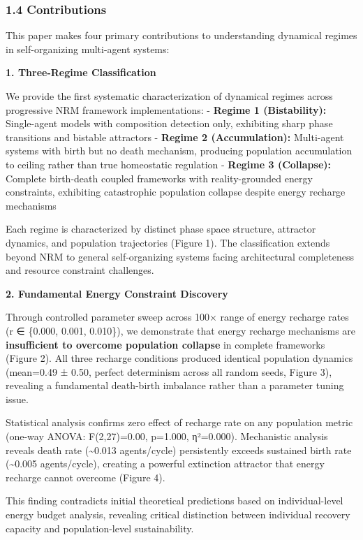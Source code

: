 \documentclass[
]{article}
\begin{document}
\subsubsection{1.4 Contributions}\label{contributions}

This paper makes four primary contributions to understanding dynamical
regimes in self-organizing multi-agent systems:

\textbf{1. Three-Regime Classification}

We provide the first systematic characterization of dynamical regimes
across progressive NRM framework implementations: - \textbf{Regime 1
(Bistability):} Single-agent models with composition detection only,
exhibiting sharp phase transitions and bistable attractors -
\textbf{Regime 2 (Accumulation):} Multi-agent systems with birth but no
death mechanism, producing population accumulation to ceiling rather
than true homeostatic regulation - \textbf{Regime 3 (Collapse):}
Complete birth-death coupled frameworks with reality-grounded energy
constraints, exhibiting catastrophic population collapse despite energy
recharge mechanisms

Each regime is characterized by distinct phase space structure,
attractor dynamics, and population trajectories (Figure 1). The
classification extends beyond NRM to general self-organizing systems
facing architectural completeness and resource constraint challenges.

\textbf{2. Fundamental Energy Constraint Discovery}

Through controlled parameter sweep across 100× range of energy recharge
rates (r ∈ \{0.000, 0.001, 0.010\}), we demonstrate that energy recharge
mechanisms are \textbf{insufficient to overcome population collapse} in
complete frameworks (Figure 2). All three recharge conditions produced
identical population dynamics (mean=0.49 ± 0.50, perfect determinism
across all random seeds, Figure 3), revealing a fundamental death-birth
imbalance rather than a parameter tuning issue.

Statistical analysis confirms zero effect of recharge rate on any
population metric (one-way ANOVA: F(2,27)=0.00, p=1.000, η²=0.000).
Mechanistic analysis reveals death rate (\textasciitilde0.013
agents/cycle) persistently exceeds sustained birth rate
(\textasciitilde0.005 agents/cycle), creating a powerful extinction
attractor that energy recharge cannot overcome (Figure 4).

This finding contradicts initial theoretical predictions based on
individual-level energy budget analysis, revealing critical distinction
between individual recovery capacity and population-level
sustainability.
\end{document}
